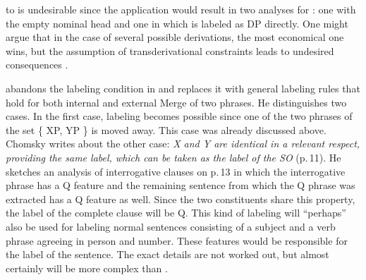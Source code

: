  to  is undesirable since the application would result in
two analyses for : one with the empty nominal head and one in which
 is labeled as DP directly. One might argue that in the case of several possible derivations, the most
economical one wins, but the assumption of transderivational constraints leads to undesired
consequences \citep[Section~5]{Pullum2013a}.

\addlines[-1]
\citet{Chomsky2013a} abandons the labeling condition in  and replaces it with general
labeling rules that hold for both internal and external Merge of two phrases. He distinguishes two
cases. In the first case, labeling becomes possible since one of the two phrases of the set \{ XP,
YP \} is moved away. This case was already discussed above. Chomsky writes about the other case: \emph{X and Y are identical in a relevant respect, providing the same label, which can be
  taken as the label of the SO} (p.\,11). He sketches an analysis of interrogative clauses on
  p.\,13 in which the interrogative phrase has a Q feature and the remaining sentence from which the
  Q phrase was extracted has a Q feature as well. Since the two constituents share this property, the
  label of the complete clause will be Q. This kind of labeling will ``perhaps'' also be used for
  labeling normal sentences consisting of a subject and a verb phrase agreeing in person and
  number. These features would be responsible for the label of the sentence. The exact details are
  not worked out, but almost certainly will be more complex than .

